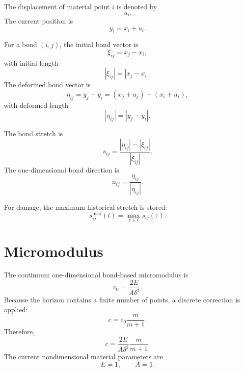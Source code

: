 \documentclass[11pt]{article}
\begin{document}
The displacement of material point \(i\) is denoted by
\begin{equation}
u_i .
\end{equation}
The current position is
\begin{equation}
y_i = x_i + u_i.
\end{equation}

For a bond \((i,j)\), the initial bond vector is
\begin{equation}
\xi_{ij} = x_j - x_i,
\end{equation}
with initial length
\begin{equation}
|\xi_{ij}| = |x_j-x_i|.
\end{equation}
The deformed bond vector is
\begin{equation}
\eta_{ij} = y_j-y_i
          = (x_j+u_j)-(x_i+u_i),
\end{equation}
with deformed length
\begin{equation}
|\eta_{ij}| = |y_j-y_i|.
\end{equation}

The bond stretch is
\begin{equation}
s_{ij}
=
\frac{|\eta_{ij}|-|\xi_{ij}|}{|\xi_{ij}|}.
\end{equation}
The one-dimensional bond direction is
\begin{equation}
n_{ij}
=
\frac{\eta_{ij}}{|\eta_{ij}|}.
\end{equation}

For damage, the maximum historical stretch is stored:
\begin{equation}
s^{\max}_{ij}(t)
=
\max_{\tau \le t} s_{ij}(\tau).
\end{equation}

\section{Micromodulus}

The continuum one-dimensional bond-based micromodulus is
\begin{equation}
c_0 = \frac{2E}{A\delta^2}.
\end{equation}
Because the horizon contains a finite number of points, a discrete correction is applied:
\begin{equation}
c = c_0 \frac{m}{m+1}.
\end{equation}
Therefore,
\begin{equation}
c
=
\frac{2E}{A\delta^2}
\frac{m}{m+1}.
\end{equation}
The current nondimensional material parameters are
\begin{equation}
E = 1,
\qquad
A = 1.
\end{equation}
\end{document}
